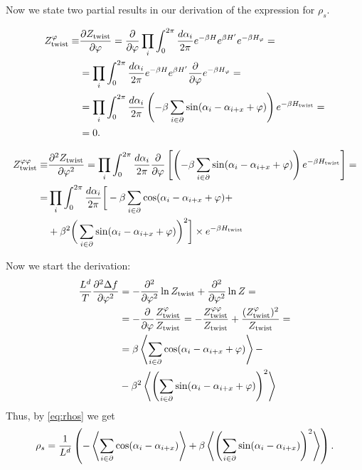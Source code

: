 Now we state two partial results in our derivation of the expression for $\rho_s$.

\begin{align}
  Z^{\varphi}_{\textrm{twist}}\equiv&\frac{\partial Z_{\textrm{twist}}}{\partial \varphi} =  \frac{\partial}{\partial \varphi}\prod_{i}\int_{0}^{2\pi}\frac{d \alpha_i}{2\pi} e^{ -\beta H}e^{\beta H'} e^{-\beta H_\varphi}= \\
   &=  \prod_{i}\int_{0}^{2\pi}\frac{d \alpha_i}{2\pi} e^{ -\beta H}e^{\beta H'}\frac{\partial}{\partial \varphi} e^{-\beta H_\varphi}= \\
  &= \prod_{i}\int_{0}^{2\pi}\frac{d \alpha_i}{2\pi} \left(-\beta\sum\limits_{i\in\partial} \sin(\alpha_i - \alpha_{i+x} + \varphi)\right)e^{ -\beta H_{\textrm{twist}}} = \\
  &= 0.
  \label{}
\end{align}

\begin{align}
  Z^{\varphi\varphi}_{\textrm{twist}}\equiv&\frac{\partial^2 Z_{\textrm{twist}}}{\partial \varphi^2} = \prod_{i}\int_{0}^{2\pi}\frac{d \alpha_i}{2\pi} \frac{\partial}{\partial \varphi}\left[\left(-\beta\sum_{i\in\partial}\sin(\alpha_i - \alpha_{i+x} + \varphi)\right)e^{ -\beta H_{\textrm{twist}}}\right] =\\
  =& \prod_{i}\int_{0}^{2\pi}\frac{d \alpha_i}{2\pi} \bigg[-\beta\sum_{i\in\partial}\cos(\alpha_i - \alpha_{i+x} + \varphi) +\\
   &+ \beta^2\bigg(\sum_{i\in\partial}\sin(\alpha_i - \alpha_{i+x} + \varphi)\bigg)^2\bigg] \times e^{ -\beta H_{\textrm{twist}}} \\
  \label{}
\end{align}

Now we start the derivation:
\begin{align}
  \frac{L^d}{T}\frac{\partial^2 \Delta f}{\partial \varphi^2} &= -\frac{\partial^2}{\partial\varphi^2}\ln Z_{\textrm{twist}} +\frac{\partial^2}{\partial\varphi^2}\ln Z = \\
  &=-\frac{\partial }{\partial \varphi}\frac{Z^{\varphi}_{\textrm{twist}}}{Z_{\textrm{twist}}} = -\frac{Z^{\varphi\varphi}_{\textrm{twist}}}{Z_{\textrm{twist}}} + \frac{(Z^{\varphi}_{\textrm{twist}})^2}{Z_{\textrm{twist}}} =\\
  &=\beta\left\langle \sum_{i\in\partial}\cos(\alpha_i -\alpha_{i+x} + \varphi)\right\rangle - \\
  &- \beta^2\left\langle\left(\sum_{i\in\partial}\sin(\alpha_i - \alpha_{i+x} +\varphi)\right)^2\right\rangle
  \label{}
\end{align}
Thus, by \ref{eq:rhos} we get
\begin{equation}
  \rho_s = \frac{1}{L^d}\left(-\left\langle \sum_{i\in\partial}\cos(\alpha_i -\alpha_{i+x} )\right\rangle + \beta\left\langle\left(\sum_{i\in\partial}\sin(\alpha_i - \alpha_{i+x}) \right)^2\right\rangle\right).
  \label{}
\end{equation}


